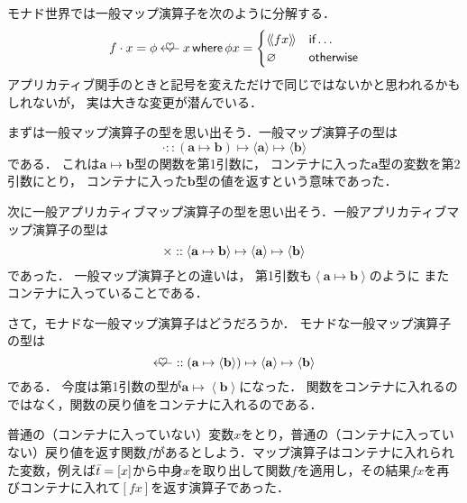 \documentclass[a5paper,draft]{jsbook}
\newcommand{\mathTypeParameter}[1]{\mathbf{#1}}
\newcommand{\mathListVar}[1]{\Bar{#1}}
\newcommand{\mathPureWith}[1]{\left\langle#1\right\rangle}
\newcommand{\mathUnitWith}[1]{\left\langle\!\left\langle#1\right\rangle\!\right\rangle}
\newcommand{\mathPureNothing}{\varnothing}
\newcommand{\mathApplicativeGeneralMap}{\mathbin{\times}}
\newcommand{\mathBind}{\mathbin{\ooalign{$\longleftarrow$\crcr\hss$\heartsuit$\hss}}}
\newcommand{\mathGeneralMap}{\mathbin{\cdot}}
\newcommand{\mathIn}{\mathrel{::}}
\newcommand{\mathMapsTo}{\mapsto}
\newcommand{\mathKeyword}[1]{\operatorname{\textsf{#1}}}
\newcommand{\mathIf}{\mathKeyword{if}}
\newcommand{\mathOtherwise}{\mathKeyword{otherwise}}
\newcommand{\mathWhere}{\mathKeyword{where}}
\newcommand{\mathMorph}[2]{#1\mathMapsTo#2}
\newcommand{\mathMorphII}[3]{#1\mathMapsTo#2\mathMapsTo#3}
\begin{document}
モナド世界では一般マップ演算子を次のように分解する．
\begin{equation}
f\mathGeneralMap x=\phi\mathBind x
\mathWhere
\phi x=\begin{cases}
\mathUnitWith{fx}&\mathIf\dots\\
\mathPureNothing&\mathOtherwise
\end{cases}
\end{equation}
アプリカティブ関手のときと記号を変えただけで同じではないかと思われるかもしれないが，
実は大きな変更が潜んでいる．

まずは一般マップ演算子の型を思い出そう．一般マップ演算子の型は
\begin{equation}
\mathGeneralMap
\mathIn{}\mathMorphII{(\mathMorph{\mathTypeParameter{a}}{\mathTypeParameter{b}})}{\langle\mathTypeParameter{a}\rangle}{\langle\mathTypeParameter{b}\rangle}
\end{equation}
である．
これは$\mathTypeParameter{a}\mapsto\mathTypeParameter{b}$型の関数を第1引数に，
コンテナに入った$\mathTypeParameter{a}$型の変数を第2引数にとり，
コンテナに入った$\mathTypeParameter{b}$型の値を返すという意味であった．

次に一般アプリカティブマップ演算子の型を思い出そう．一般アプリカティブマップ演算子の型は
\begin{equation}
\mathApplicativeGeneralMap
\mathIn{}\mathMorphII{\langle\mathMorph{\mathTypeParameter{a}}{\mathTypeParameter{b}}\rangle}{\langle\mathTypeParameter{a}\rangle}{\langle\mathTypeParameter{b}\rangle}\\
\end{equation}
であった．
一般マップ演算子との違いは，
第1引数も$\mathPureWith{\mathTypeParameter{a}\mapsto\mathTypeParameter{b}}$のように
またコンテナに入っていることである．

さて，モナドな一般マップ演算子はどうだろうか．
モナドな一般マップ演算子の型は
\begin{equation}
\mathBind
\mathIn{}\mathMorphII{(\mathMorph{\mathTypeParameter{a}}{\langle\mathTypeParameter{b}\rangle})}{\langle\mathTypeParameter{a}\rangle}{\langle{\mathTypeParameter{b}}\rangle}
\end{equation}
である．
今度は第1引数の型が$\mathTypeParameter{a}\mapsto\mathPureWith{\mathTypeParameter{b}}$になった．
関数をコンテナに入れるのではなく，関数の戻り値をコンテナに入れるのである．

普通の（コンテナに入っていない）変数$x$をとり，普通の（コンテナに入っていない）戻り値を返す関数$f$があるとしよう．マップ演算子はコンテナに入れられた変数，例えば$\mathListVar{t}=[x]$から中身$x$を取り出して関数$f$を適用し，その結果$fx$を再びコンテナに入れて$[fx]$を返す演算子であった．
\end{document}
